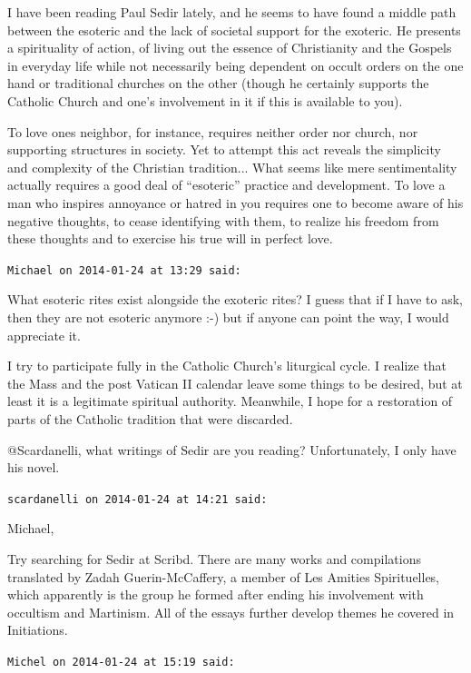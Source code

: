 \begin{footnotesize}
\begin{sffamily}
I have been reading Paul Sedir lately, and he seems to have found a middle path between the esoteric and the lack of societal support for the exoteric. He presents a spirituality of action, of living out the essence of Christianity and the Gospels in everyday life while not necessarily being dependent on occult orders on the one hand or traditional churches on the other (though he certainly supports the Catholic Church and one's involvement in it if this is available to you).

To love ones neighbor, for instance, requires neither order nor church, nor supporting structures in society. Yet to attempt this act reveals the simplicity and complexity of the Christian tradition... What seems like mere sentimentality actually requires a good deal of ``esoteric'' practice and development. To love a man who inspires annoyance or hatred in you requires one to become aware of his negative thoughts, to cease identifying with them, to realize his freedom from these thoughts and to exercise his true will in perfect love.

\hfill

\texttt{Michael on 2014-01-24 at 13:29 said:}

What esoteric rites exist alongside the exoteric rites? I guess that if I have to ask, then they are not esoteric anymore :-) but if anyone can point the way, I would appreciate it.

I try to participate fully in the Catholic Church's liturgical cycle. I realize that the Mass and the post Vatican II calendar leave some things to be desired, but at least it is a legitimate spiritual authority. Meanwhile, I hope for a restoration of parts of the Catholic tradition that were discarded.

@Scardanelli, what writings of Sedir are you reading? Unfortunately, I only have his novel.

\hfill

\texttt{scardanelli on 2014-01-24 at 14:21 said:}

Michael,

Try searching for Sedir at Scribd. There are many works and compilations translated by Zadah Guerin-McCaffery, a member of Les Amities Spirituelles, which apparently is the group he formed after ending his involvement with occultism and Martinism. All of the essays further develop themes he covered in Initiations.

\hfill

\texttt{Michel on 2014-01-24 at 15:19 said:}


\end{sffamily}
\end{footnotesize}
